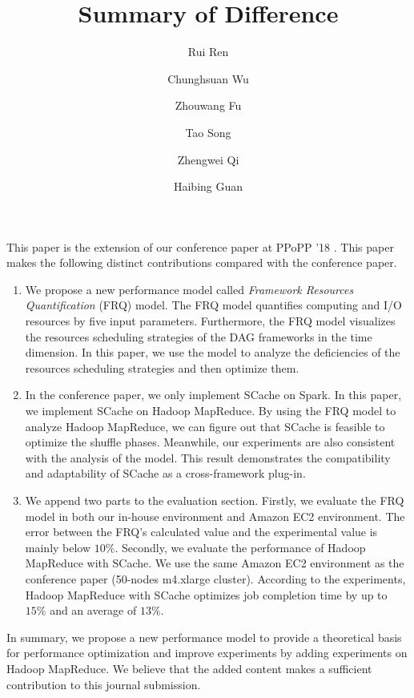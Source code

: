 \documentclass[12pt,reqno]{amsart}
\title{Summary of Difference}
\author{Rui Ren}
\author{Chunghsuan Wu}
\author{Zhouwang Fu}
\author{Tao Song}
\author{Zhengwei Qi}
\author{Haibing Guan}
\theoremstyle{plain}
\numberwithin{equation}{section}
\theoremstyle{plain}
\numberwithin{equation}{section}
\begin{document}
\maketitle



This paper is the extension of our conference paper at PPoPP '18 \cite{fu2018efficient}. 
This paper makes the following distinct contributions compared with the conference paper.

\begin{enumerate}
\item 
We propose a new performance model called \textit{Framework Resources Quantification} (FRQ) model.
The FRQ model quantifies computing and I/O resources by five input parameters. 
Furthermore, the FRQ model visualizes the resources scheduling strategies of the DAG frameworks in the time dimension. 
In this paper, we use the model to analyze the deficiencies of the resources scheduling strategies and then optimize them.
\item 
In the conference paper, we only implement SCache on Spark. 
In this paper, we implement SCache on Hadoop MapReduce. 
By using the FRQ model to analyze Hadoop MapReduce, we can figure out that SCache is feasible to optimize the shuffle phases. 
Meanwhile, our experiments are also consistent with the analysis of the model.
This result demonstrates the compatibility and adaptability of SCache as a cross-framework plug-in.
\item
We append two parts to the evaluation section. 
Firstly, we evaluate the FRQ model in both our in-house environment and Amazon EC2 environment. The error between the FRQ’s calculated value and the experimental value is mainly below $10\%$. 
Secondly, we evaluate the performance of Hadoop MapReduce with SCache. We use the same Amazon EC2 environment as the conference paper (50-nodes m4.xlarge cluster).
According to the experiments, Hadoop MapReduce with SCache optimizes job completion time by up to $15\%$ and an average of $13\%$.
\end{enumerate}

In summary, we propose a new performance model to provide a theoretical basis for performance optimization and improve experiments by adding experiments on Hadoop MapReduce. 
We believe that the added content makes a sufficient contribution to this journal submission.



\end{document}
